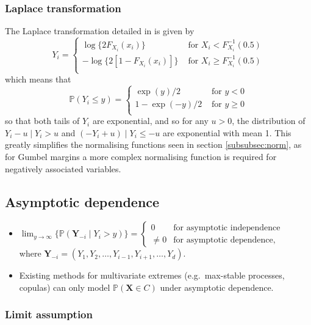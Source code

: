 \documentclass{article}
\begin{document}
\subsubsection{Laplace transformation}
The Laplace transformation detailed in \cite{Keef2013} is given by
\[
  Y_i = \begin{cases}
    \log\{2F_{X_i}(x_i)\} &\text{ for } X_i < F_{X_i}^{-1}(0.5) \\
    -\log\{2[1 - F_{X_i}(x_i)]\} &\text{ for } X_i \ge F_{X_i}^{-1}(0.5) \\
  \end{cases}
\]
which means that 
\[
  \mathbb{P}(Y_i \le y) = \begin{cases}
    \exp(y)/2 &\text{ for } y < 0 \\
    1-\exp(-y)/2 &\text{ for } y \ge 0 \\
  \end{cases}
\]
so that both tails of $Y_i$ are exponential, and so for any $u > 0$, the distribution of $Y_i - u \mid Y_i > u$ and $(-Y_i + u) \mid Y_i \le -u$ are exponential with mean 1. 
This greatly simplifies the normalising functions seen in section \ref{subsubsec:norm}, as for Gumbel margins a more complex normalising function is required for negatively associated variables. 

\subsection{Asymptotic dependence}

\begin{itemize}
  \item $
      \lim_{y \rightarrow \infty}\{\mathbb{P}(\bm{Y}_{-i} \mid Y_i > y)\} = \begin{cases}
      0 &\text{for asymptotic independence} \\
      \ne 0 &\text{for asymptotic dependence}, 
    \end{cases}
    $ \\
  where $\bm{Y}_{-i} = (Y_1, Y_2, \ldots, Y_{i-1}, Y_{i+1}, \ldots, Y_d)$. 
  \item Existing methods for multivariate extremes (e.g.\ max-stable processes, copulas) can only model $\mathbb{P}(\bm{X} \in C)$ under asymptotic dependence.
\end{itemize}

\subsubsection{Limit assumption}
\end{document}
